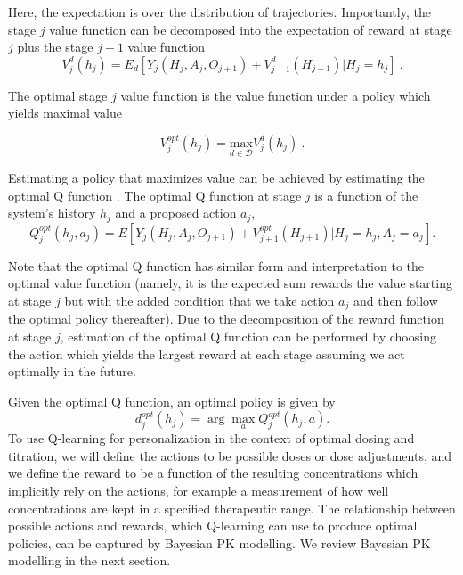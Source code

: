 \noindent Here, the expectation is over the distribution of trajectories. Importantly, the stage $ j $ 
value function can be decomposed into the expectation of reward at stage $ j $ plus the stage $ j+1  $ value function  \cite{chakraborty2013statistical}
\begin{equation}
V^d_j(h_j) = E_d\left[Y_j(H_j, A_j, O_{j+1}) + V^d_{j+1}(H_{j+1}) \vert H_j = h_j\right] \>.
\end{equation}


\noindent The optimal stage $ j  $ value function is the value function under a policy which yields maximal value

\begin{equation}
V^{opt}_j(h_j) = \underset{d \in \mathscr{D}}{\mbox{max}} V^d_j(h_j) \>.
\end{equation}

\noindent  Estimating a policy that maximizes value can be achieved by estimating the optimal Q function \cite{chakraborty2013statistical}.  The optimal Q function at stage $ j $ is a function of the system’s history $ h_j $ and a proposed action $ a_j $,
\begin{equation}
 Q_j^{opt}(h_j, a_j) = E \left[ 
 Y_j(H_j, A_j, O_{j+1}) + V^{opt}_{j+1}(H_{j+1}) \lvert H_j = h_j, A_j = a_j
 \right].
\end{equation}

Note that the optimal Q function has similar form and interpretation to the optimal value function (namely, it is the expected sum rewards \textemdash the value \textemdash starting at stage $ j $ but with the added condition that we take action $ a_j $ and then follow the optimal policy thereafter). Due to the decomposition of the reward function at stage $ j $, estimation of the optimal Q function can be performed by choosing the action which yields the largest reward at each stage assuming we act optimally in the future. 

Given the optimal Q function, an optimal policy is given by 
\begin{equation}
d_j^{opt}(h_j) = \arg\max_{a} Q_j^{opt}(h_j,a).
\end{equation}
To use Q-learning for personalization in the context of optimal dosing and titration, we will define the actions to be possible doses or dose adjustments, and we define the reward to be a function of the resulting concentrations which implicitly rely on the actions, for example a measurement of how well concentrations are kept in a specified therapeutic range. The relationship between possible actions and rewards, which Q-learning can use to produce optimal policies, can be captured by Bayesian PK modelling. We review Bayesian PK modelling in the next section.

